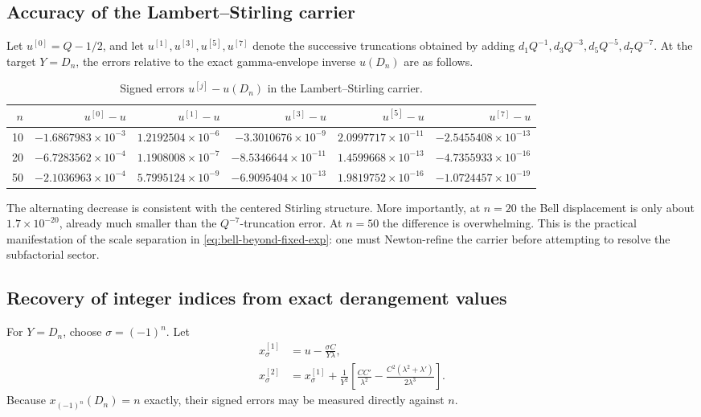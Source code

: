 \documentclass[11pt]{article}
\numberwithin{equation}{section}
\theoremstyle{mainthm}
\theoremstyle{defstyle}
\theoremstyle{remark}
\begin{document}
\subsection{Accuracy of the Lambert--Stirling carrier}

Let \(u^{[0]}=Q-1/2\), and let \(u^{[1]},u^{[3]},u^{[5]},u^{[7]}\) denote the successive truncations obtained by adding \(d_1Q^{-1},d_3Q^{-3},d_5Q^{-5},d_7Q^{-7}\).  At the target \(Y=D_n\), the errors relative to the exact gamma-envelope inverse \(u(D_n)\) are as follows.

\begin{table}[htbp]
\centering
\small
\setlength{\tabcolsep}{3.2pt}
\caption{Signed errors \(u^{[j]}-u(D_n)\) in the Lambert--Stirling carrier.}
\label{tab:carrier-errors}
\begin{tabular}{r r r r r r}
\toprule
\(n\) & \(u^{[0]}-u\) & \(u^{[1]}-u\) & \(u^{[3]}-u\) & \(u^{[5]}-u\) & \(u^{[7]}-u\)\\
\midrule
10 & \(-1.6867983\!\times10^{-3}\) & \(1.2192504\!\times10^{-6}\) & \(-3.3010676\!\times10^{-9}\) & \(2.0997717\!\times10^{-11}\) & \(-2.5455408\!\times10^{-13}\)\\
20 & \(-6.7283562\!\times10^{-4}\) & \(1.1908008\!\times10^{-7}\) & \(-8.5346644\!\times10^{-11}\) & \(1.4599668\!\times10^{-13}\) & \(-4.7355933\!\times10^{-16}\)\\
50 & \(-2.1036963\!\times10^{-4}\) & \(5.7995124\!\times10^{-9}\) & \(-6.9095404\!\times10^{-13}\) & \(1.9819752\!\times10^{-16}\) & \(-1.0724457\!\times10^{-19}\)\\
\bottomrule
\end{tabular}
\end{table}

The alternating decrease is consistent with the centered Stirling structure.  More importantly, at \(n=20\) the Bell displacement is only about \(1.7\times10^{-20}\), already much smaller than the \(Q^{-7}\)-truncation error.  At \(n=50\) the difference is overwhelming.  This is the practical manifestation of the scale separation in \cref{eq:bell-beyond-fixed-exp}: one must Newton-refine the carrier before attempting to resolve the subfactorial sector.

\subsection{Recovery of integer indices from exact derangement values}

For \(Y=D_n\), choose \(\sigma=(-1)^n\).  Let
\begin{align}
 x_\sigma^{[1]}
 &=u-\frac{\sigma C}{Y\lambda},\label{eq:x-parity-num-1}\\
 x_\sigma^{[2]}
 &=x_\sigma^{[1]}+\frac1{Y^2}
 \left[
 \frac{CC'}{\lambda^2}
 -\frac{C^2(\lambda^2+\lambda')}{2\lambda^3}
 \right].
 \label{eq:x-parity-num-2}
\end{align}
Because \(x_{(-1)^n}(D_n)=n\) exactly, their signed errors may be measured directly against \(n\).
\end{document}
